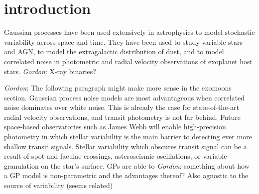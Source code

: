 \documentclass[modern]{aastex62}
\newcommand{\todo}[3]{{\color{#2}\emph{#1}: #3}}
\newcommand{\gordontodo}[1]{\todo{Gordon}{red}{#1}}
\begin{document}
\tableofcontents

\section{introduction}\label{sec:intro}
	Gaussian processes have been used extensively in astrophysics to model stochastic variability across space and time. 
	They have been used to study variable stars and AGN, to model the extragalactic distribution of dust, and to model correlated noise in 
	photometric and radial velocity observations of exoplanet host stars.	\gordontodo{X-ray binaries?}
	
	\gordontodo{The following paragraph might make more sense in the exomoons section.}
	Gaussian process noise models are most advantageous when correlated noise dominates over white noise. 
	This is already the case for state-of-the-art radial velocity observations, and transit 
	photometry is not far behind. Future space-based observatories such as James Webb 
	will enable high-precision photometry in which stellar variability is the main barrier to detecting ever more shallow transit signals. 
	Stellar variability which obscures transit signal can be a result of spot and faculae crossings, asteroseismic oscillations, or variable 
	granulation on the star's surface. GPs are able to \gordontodo{something about how a GP model is non-parametric and the advantages thereof? Also agnostic 
	to the source of variability (seems related)}
	
\end{document}
